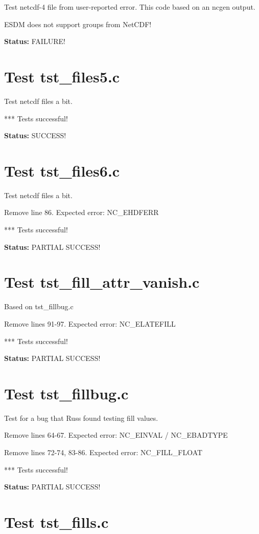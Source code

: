 Test netcdf-4 file from user-reported error. This code based on an ncgen output.

ESDM does not support groups from NetCDF!

{\bf \large Status: } FAILURE!

\section{Test tst\_files5.c}

Test netcdf files a bit.

*** Tests successful!

{\bf \large Status: } SUCCESS!

\section{Test tst\_files6.c}

Test netcdf files a bit.

Remove line 86. Expected error: NC\_EHDFERR

*** Tests successful!

{\bf \large Status: } PARTIAL SUCCESS!

\section{Test tst\_fill\_attr\_vanish.c}

Based on tst\_fillbug.c

Remove lines 91-97. Expected error: NC\_ELATEFILL

*** Tests successful!

{\bf \large Status: } PARTIAL SUCCESS!

\section{Test tst\_fillbug.c}

Test for a bug that Russ found testing fill values.

Remove lines 64-67. Expected error: NC\_EINVAL / NC\_EBADTYPE

Remove lines 72-74, 83-86. Expected error: NC\_FILL\_FLOAT

*** Tests successful!

{\bf \large Status: } PARTIAL SUCCESS!

\section{Test tst\_fills.c}

